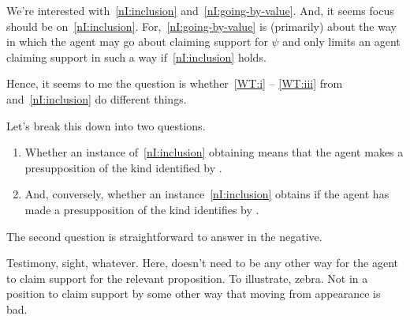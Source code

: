 \begin{note}
  We're interested with~\ref{nI:inclusion} and~\ref{nI:going-by-value}.
  And, it seems focus should be on~\ref{nI:inclusion}.
  For,~\ref{nI:going-by-value} is (primarily) about the way in which the agent may go about claiming support for \(\psi\) and \nI{} only limits an agent claiming support in such a way if~\ref{nI:inclusion} holds.

  Hence, it seems to me the question is whether~\ref{WT:i} -- \ref{WT:iii} from \wrt{} and~\ref{nI:inclusion} do different things.
\end{note}

\begin{note}
  Let's break this down into two questions.

  \begin{enumerate}
  \item Whether an instance of~\ref{nI:inclusion} obtaining means that the agent makes a presupposition of the kind identified by \wrt{}.
  \item And, conversely, whether an instance~\ref{nI:inclusion} obtains if the agent has made a presupposition of the kind identifies by \wrt{}.
  \end{enumerate}
\end{note}

\begin{note}
  The second question is straightforward to answer in the negative.

  Testimony, sight, whatever.
  Here, doesn't need to be any other way for the agent to claim support for the relevant proposition.
  {
    \color{red}
    To illustrate, zebra.
    Not in a position to claim support by some other way that moving from appearance is bad.
  }
\end{note}

